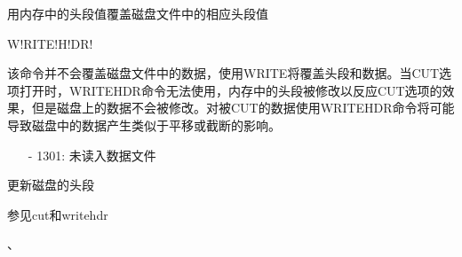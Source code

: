 \label{cmd:writehdr}

用内存中的头段值覆盖磁盘文件中的相应头段值

W!RITE!H!DR!


该命令并不会覆盖磁盘文件中的数据，使用WRITE将覆盖头段和数据。当CUT选项打开时，WRITEHDR命令无法使用，内存中的头段被修改以反应CUT选项的效果，但是磁盘上的数据不会被修改。对被CUT的数据使用WRITEHDR命令将可能导致磁盘中的数据产生类似于平移或截断的影响。

\begin{itemize}
\item[-]1301: 未读入数据文件
\end{itemize}

更新磁盘的头段

参见cut和writehdr

、
